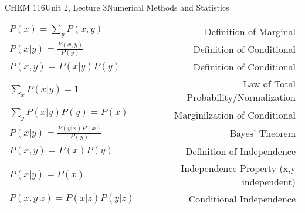 \documentclass{article}
\begin{document}
\begin{tdoc}{CHEM 116}{Unit 2, Lecture 3}{Numerical Methods and Statistics}
  \begin{tabular}{lr}
    $P(x) = \sum_y P(x,y)$ & Definition of Marginal\vspace{0.15cm}\\
    $P(x|y) = \frac{P(x,y)}{P(y)}$ & Definition of Conditional\vspace{0.15cm}\\
    $P(x,y) = P(x|y)P(y)$ & Definition of Conditional\vspace{0.15cm}\\
    $\sum_x P(x|y) = 1$ & Law of Total Probability/Normalization\vspace{0.15cm}\\
    $\sum_y P(x|y)P(y) = P(x)$ & Marginilzation of Conditional\vspace{0.15cm}\\
    $P(x|y) = \frac{P(y|x)P(x)}{P(y)}$ & Bayes' Theorem\vspace{0.15cm}\\
    $P(x,y) = P(x)P(y)$ & Definition of Independence\vspace{0.15cm}\\
    $P(x | y) = P(x)$ & Independence Property (x,y independent)\vspace{0.15cm}\\
    $P(x,y | z) = P(x|z)P(y|z)$ & Conditional Independence\vspace{0.15cm}\\
  \end{tabular}

\end{tdoc}
\end{document}

